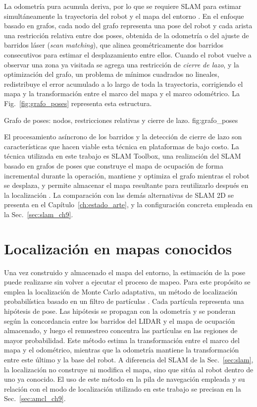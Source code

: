 La odometría pura acumula deriva, por lo que se requiere SLAM para estimar
simultáneamente la trayectoria del robot y el mapa del entorno
\citep{thrun2005probabilistic,ngoc2023efficient}. En el enfoque basado en
grafos, cada nodo del grafo representa una pose del robot y cada arista una
restricción relativa entre dos poses, obtenida de la odometría o del ajuste
de barridos láser (\textit{scan matching}), que alinea geométricamente dos
barridos consecutivos para estimar el desplazamiento entre ellos. Cuando el
robot vuelve a observar una zona ya visitada se agrega una restricción de
\emph{cierre de lazo}, y la optimización del grafo, un problema de mínimos
cuadrados no lineales, redistribuye el error acumulado a lo largo de toda
la trayectoria, corrigiendo el mapa y la transformación entre el marco del
mapa y el marco odométrico. La Fig.~\ref{fig:grafo_poses} representa esta
estructura.

{Grafo de poses: nodos, restricciones relativas y cierre de lazo.}
{fig:grafo_poses}

El procesamiento asíncrono de los barridos y la detección de cierre de lazo
son características que hacen viable esta técnica en plataformas de bajo
costo. La técnica utilizada en este trabajo es SLAM Toolbox, una realización del SLAM basado en grafos de
poses que construye el mapa de ocupación de forma incremental durante la
operación, mantiene y optimiza el grafo mientras el robot se desplaza, y
permite almacenar el mapa resultante para reutilizarlo después en la
localización \citep{macenski2021slamtoolbox}. La comparación con las demás
alternativas de SLAM 2D se presenta en el Capítulo~\ref{ch:estado_arte}, y la
configuración concreta empleada en la Sec.~\ref{sec:slam_ch9}.

\section{Localización en mapas conocidos}
\label{sec:localizacion_marco}

Una vez construido y almacenado el mapa del entorno, la estimación de la pose
puede realizarse sin volver a ejecutar el proceso de mapeo. Para este propósito
se emplea la localización de Monte Carlo adaptativa, un método de localización
probabilística basado en un filtro de partículas
\citep{thrun2005probabilistic}.
Cada partícula representa una hipótesis de pose. Las hipótesis se propagan con la odometría y se ponderan según la concordancia entre los barridos del \gls{LIDAR} y el mapa de ocupación almacenado, y luego el remuestreo concentra las partículas en las regiones de mayor probabilidad. Este método estima la transformación entre el marco del mapa y el odométrico, mientras que la odometría mantiene la transformación entre este último y la base del robot. A diferencia del SLAM de la Sec.~\ref{sec:slam}, la localización no construye ni modifica el mapa, sino que sitúa al robot dentro de uno ya conocido. El uso de este método en la pila de navegación empleada y su relación con el
modo de localización utilizado en este trabajo se precisan en la
Sec.~\ref{sec:amcl_ch9}.


